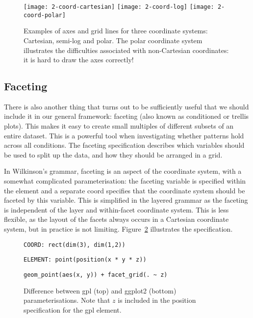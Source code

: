 
\begin{figure}[htbp]
	\centering
		\texttt{[image: 2-coord-cartesian]}
		\texttt{[image: 2-coord-log]}
		\texttt{[image: 2-coord-polar]}
	\caption{Examples of axes and grid lines for three coordinate systems: Cartesian, semi-log and polar. The polar coordinate system illustrates the difficulties associated with non-Cartesian coordinates: it is hard to draw the axes correctly!}
	\label{fig:coord}
\end{figure}

\subsection{Faceting}\label{sec:faceting}

There is also another thing that turns out to be sufficiently useful that we should include it in our general framework: faceting (also known as conditioned or trellis plots). This makes it easy to create small multiples of different subsets of an entire dataset. This is a powerful tool when investigating whether patterns hold across all conditions.  The faceting specification describes which variables should be used to split up the data, and how they should be arranged in a grid.

In Wilkinson's grammar, faceting is an aspect of the coordinate system, with a somewhat complicated parameterisation: the faceting variable is specified within the {\sc element} and a separate {\sc coord} specifies that the coordinate system should be faceted by this variable.  This is simplified in the layered grammar as the faceting is independent of the layer and within-facet coordinate system. This is less flexible, as the layout of the facets always occurs in a Cartesian coordinate system, but in practice is not limiting.  Figure~\ref{fig:facet-vs-coord} illustrates the specification.

\begin{figure}[htbp]
  \verb|COORD: rect(dim(3), dim(1,2))|
  
  \verb|ELEMENT: point(position(x * y * z))|
  
  \verb||
  
  \verb|geom_point(aes(x, y)) + facet_grid(. ~ z)|
  
  \caption{Difference between {\sc gpl} (top) and ggplot2 (bottom) parameterisations. Note that $z$ is included in the position specification for the {\sc gpl} element.}
  \label{fig:facet-vs-coord}
\end{figure}


